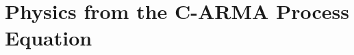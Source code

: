 \documentclass[a4paper,fleqn,usenatbib]{mnras}
\begin{document}


\section[C-ARMA Physics]{Physics from the C-ARMA Process Equation}\label{sec:Meaning}
\end{document}
